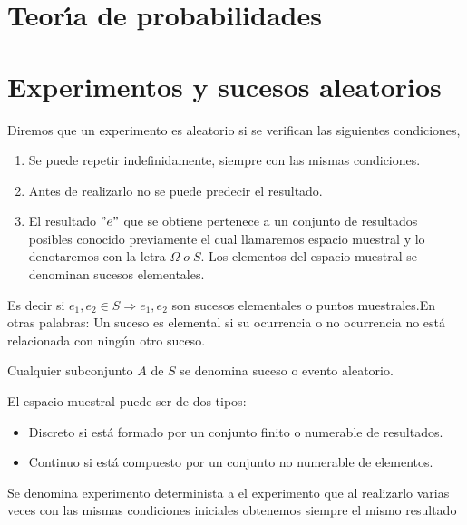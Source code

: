 


\section{Teor\'{\i}a de probabilidades}

\section{Experimentos y sucesos aleatorios}%

\begin{definition}
Diremos que un experimento es aleatorio si se veri\-fican las siguientes
condiciones,
\begin{enumerate}
\item Se puede repetir indefinidamente, siempre con las mismas condiciones.
\item Antes de realizarlo no se puede predecir el resultado.  \item El
resultado ''$e"$ que se obtiene pertenece a un conjunto de resultados posibles
conocido previamente el cual llamaremos espacio muestral y lo denotaremos con
la letra $\Omega\;o\;S$. Los elementos del espacio muestral se denominan
sucesos elementales.
\end{enumerate}
\end{definition} 

Es decir si $e_{1},e_{2}\in S\Longrightarrow e_{1},e_{2}$ son sucesos
elementales o puntos muestrales.En otras palabras: Un suceso es elemental si
su ocu\-rrencia o no ocurrencia no est\'{a} relacionada con ning\'{u}n otro suceso.

Cualquier subconjunto $A$ de $S$ se denomina suceso o evento aleatorio.

El espacio muestral puede ser de dos tipos:

\begin{itemize}
\item Discreto si est\'{a} formado por un conjunto finito o numerable de resultados.

\item Continuo si est\'{a} compuesto por un conjunto no numerable de elementos.
\end{itemize}%

\begin{definition}
Se denomina experimento determinista a el experimento que
al realizarlo varias veces con las mismas condiciones iniciales obtenemos
siempre el mismo resultado
\end{definition} 

